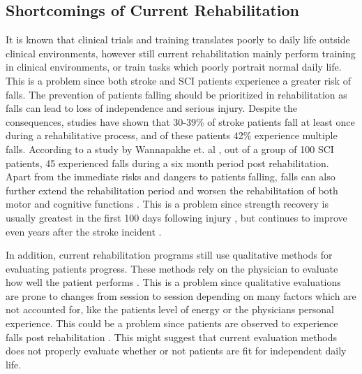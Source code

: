
\subsection{Shortcomings of Current Rehabilitation}

It is known that clinical trials and training translates poorly to daily life outside clinical environments, however still current rehabilitation mainly perform training in clinical environments, or train tasks which poorly portrait normal daily life. \cite{Basteris2014}
This is a problem since both stroke and SCI patients experience a greater risk of falls. The prevention of patients falling should be prioritized in rehabilitation as falls can lead to loss of independence and serious injury. Despite the consequences, studies have shown that 30-39\% of stroke patients fall at least once during a rehabilitative process, and of these patients 42\% experience multiple falls. \cite{Bhalla2016, Hanger2014} According to a study by Wannapakhe et. al \cite{Wannapakhe2015}, out of a group of 100 SCI patients, 45 experienced falls during a six month period post rehabilitation. %
Apart from the immediate risks and dangers to patients falling, falls can also further extend the rehabilitation period and worsen the rehabilitation of both motor and cognitive functions \cite{Wong2016, Blennerhassett2012}. This is a problem since strength recovery is usually greatest in the first 100 days following injury \cite{Weidner2017}, but continues to improve even years after the stroke incident \cite{Sun2015}.

In addition, current rehabilitation programs still use qualitative methods for evaluating patients progress. These methods rely on the physician to evaluate how well the patient performs \cite{ANPT_SCI2018, ANPT_Stroke2018}. This is a problem since qualitative evaluations are prone to changes from session to session depending on many factors which are not accounted for, like the patients level of energy or the physicians personal experience. This could be a problem since patients are observed to experience falls post rehabilitation \cite{Bhalla2016, Hanger2014, Wannapakhe2015}. This might suggest that current evaluation methods does not properly evaluate whether or not patients are fit for independent daily life. 




